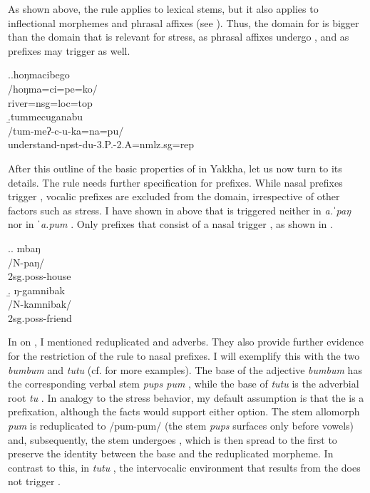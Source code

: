 As shown above, the  rule applies to lexical stems, but it also applies to inflectional morphemes and phrasal affixes (see \Next). Thus, the domain for  is bigger than the domain that is relevant for stress, as phrasal affixes undergo , and as prefixes may trigger  as well.


\ex.\label{hongma}\a.\glll	hoŋmacibego\\
	 /hoŋma=ci=pe=ko/\\
		river{\sc =nsg=loc=top}\\
\b.\glll tummecuganabu\\
/tum-meʔ-c-u-ka=na=pu/\\
understand{\sc -npst-du-3.P.-2.A=nmlz.sg=rep}\\


After this outline of the basic properties of  in Yakkha, let us now turn to its details. 
The  rule needs further specification for prefixes. While nasal prefixes trigger , vocalic prefixes are excluded from the  domain, irrespective of other factors such as stress. I have shown in  above that  is triggered neither in \emph{a.ˈpaŋ}  nor in \emph{ˈa.pum} . Only prefixes that consist of a nasal trigger , as shown in \Next.


\ex.\a. \glll mbaŋ\\
/N-paŋ/\\
{\sc 2sg.poss-}house\\
\b. \glll ŋ-gamnibak\\
/N-kamnibak/\\
{\sc 2sg.poss-}friend\\

		 		 
In  on , I mentioned reduplicated  and adverbs. They also provide further evidence for the restriction of the  rule to nasal prefixes. I will exemplify this with the two  \emph{bumbum}  and \emph{tutu}  (cf.  for more examples). The base of the adjective \emph{bumbum} has the corresponding verbal stem \emph{pups \ti pum} , while the base of \emph{tutu} is the adverbial root \emph{tu} . In analogy to the stress behavior, my default assumption is that the  is a prefixation, although the  facts would support either option. The stem allomorph \emph{pum} is reduplicated to /pum-pum/ (the stem \emph{pups} surfaces only before vowels) and, subsequently, the stem undergoes , which is then spread to the first  to preserve the identity between the base and the reduplicated morpheme. In contrast to this, in \emph{tutu} , the intervocalic environment that  results from the  does not trigger .  
 
